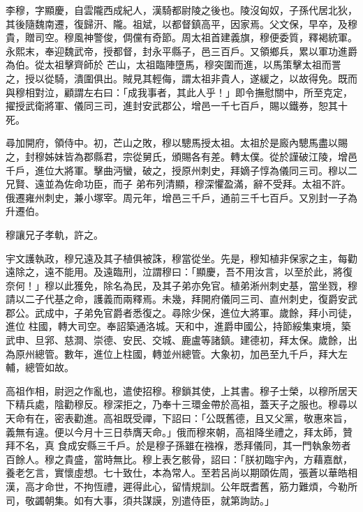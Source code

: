 
\begin{pinyinscope}

 李穆，字顯慶，自雲隴西成紀人，漢騎都尉陵之後也。陵沒匈奴，子孫代居北狄，其後隨魏南遷，復歸汧、隴。祖斌，以都督鎮高平，因家焉。父文保，早卒，及穆貴，贈司空。穆風神警俊，倜儻有奇節。周太祖首建義旗，穆便委質，釋褐統軍。永熙末，奉迎魏武帝，授都督，封永平縣子，邑三百戶。又領鄉兵，累以軍功進爵為伯。從太祖擊齊師於
 芒山，太祖臨陣墮馬，穆突圍而進，以馬策擊太祖而詈之，授以從騎，潰圍俱出。賊見其輕侮，謂太祖非貴人，遂緩之，以故得免。既而與穆相對泣，顧謂左右曰：「成我事者，其此人乎！」即令撫慰關中，所至克定，擢授武衛將軍、儀同三司，進封安武郡公，增邑一千七百戶，賜以鐵券，恕其十死。



 尋加開府，領侍中。初，芒山之敗，穆以驄馬授太祖。太祖於是廄內驄馬盡以賜之，封穆姊妹皆為郡縣君，宗從舅氏，頒賜各有差。轉太僕。從於謹破江陵，增邑千戶，進位大將軍。擊曲沔蠻，破之，授原州刺史，拜嫡子惇為儀同三司。穆以二兄賢、遠並為佐命功臣，而子
 弟布列清顯，穆深懼盈滿，辭不受拜。太祖不許。俄遷雍州刺史，兼小塚宰。周元年，增邑三千戶，通前三千七百戶。又別封一子為升遷伯。



 穆讓兄子孝軌，許之。



 宇文護執政，穆兄遠及其子植俱被誅，穆當從坐。先是，穆知植非保家之主，每勸遠除之，遠不能用。及遠臨刑，泣謂穆曰：「顯慶，吾不用汝言，以至於此，將復奈何！」穆以此獲免，除名為民，及其子弟亦免官。植弟淅州刺史基，當坐戮，穆請以二子代基之命，護義而兩釋焉。未幾，拜開府儀同三司、直州刺史，復爵安武郡公。武成中，子弟免官爵者悉復之。尋除少保，進位大將軍。歲餘，拜小司徒，進位
 柱國，轉大司空。奉詔築通洛城。天和中，進爵申國公，持節綏集東境，築武申、旦郛、慈澗、崇德、安民、交城、鹿盧等諸鎮。建德初，拜太保。歲餘，出為原州總管。數年，進位上柱國，轉並州總管。大象初，加邑至九千戶，拜大左輔，總管如故。



 高祖作相，尉迥之作亂也，遣使招穆。穆鎖其使，上其書。穆子士榮，以穆所居天下精兵處，陰勸穆反。穆深拒之，乃奉十三環金帶於高祖，蓋天子之服也。穆尋以天命有在，密表勸進。高祖既受禪，下詔曰：「公既舊德，且又父黨，敬惠來旨，義無有違。便以今月十三日恭膺天命。」俄而穆來朝，高祖降坐禮之，拜太師，贊拜不名，真
 食成安縣三千戶。於是穆子孫雖在襁褓，悉拜儀同，其一門執象笏者百餘人。穆之貴盛，當時無比。穆上表乞骸骨，詔曰：「朕初臨宇內，方藉嘉猷，養老乞言，實懷虛想。七十致仕，本為常人。至若呂尚以期頤佐周，張蒼以華皓相漢，高才命世，不拘恆禮，遲得此心，留情規訓。公年既耆舊，筋力難煩，今勒所司，敬蠲朝集。如有大事，須共謀謨，別遣侍臣，就第詢訪。」




\end{pinyinscope}
